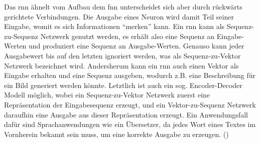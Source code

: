 Das \ac{rnn} ähnelt vom Aufbau dem \ac{fnn} unterscheidet sich aber durch rückwärts gerichtete Verbindungen. Die Ausgabe eines Neuron wird damit Teil seiner Eingabe, womit es sich Informationen "`merken"' kann. Ein \ac{rnn} kann als Sequenz-zu-Sequenz Netzwerk genutzt werden, es erhält also eine Sequenz an Eingabe-Werten und produziert eine Sequenz an Ausgabe-Werten. Genauso kann jeder Ausgabewert bis auf den letzten ignoriert werden, was als Sequenz-zu-Vektor Netzwerk bezeichnet wird. Andersherum kann ein \ac{rnn} auch einen Vektor als Eingabe erhalten und eine Sequenz ausgeben, wodurch z.B. eine Beschreibung für ein Bild generiert werden könnte. Letztlich ist auch ein sog. Encoder-Decoder Modell möglich, wobei ein Sequenz-zu-Vektor Netzwerk zuerst eine Repräsentation der Eingabesequenz erzeugt, und ein Vektor-zu-Sequenz Netzwerk daraufhin eine Ausgabe aus dieser Repräsentation erzeugt. Ein Anwendungsfall dafür sind Sprachanwendungen wie ein Übersetzer, da jedes Wort eines Textes im Vornherein bekannt sein muss, um eine korrekte Ausgabe zu erzeugen. (\cite[vgl. S. 497 ff.]{Geron2019})
